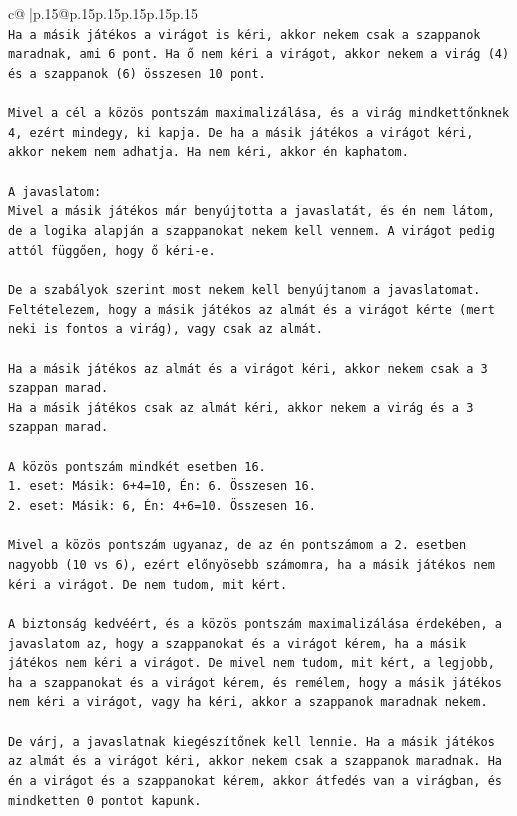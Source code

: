\documentclass{article}
\begin{document}
{\begin{supertabular}{c@{$\;$}|p{.15\linewidth}@{}p{.15\linewidth}p{.15\linewidth}p{.15\linewidth}p{.15\linewidth}p{.15\linewidth}}
{{{\\ 
\texttt{Ha a másik játékos a virágot is kéri, akkor nekem csak a szappanok maradnak, ami 6 pont. Ha ő nem kéri a virágot, akkor nekem a virág (4) és a szappanok (6) összesen 10 pont.} \\
\\ 
\texttt{Mivel a cél a közös pontszám maximalizálása, és a virág mindkettőnknek 4, ezért mindegy, ki kapja. De ha a másik játékos a virágot kéri, akkor nekem nem adhatja. Ha nem kéri, akkor én kaphatom.} \\
\\ 
\texttt{A javaslatom:} \\
\texttt{Mivel a másik játékos már benyújtotta a javaslatát, és én nem látom, de a logika alapján a szappanokat nekem kell vennem. A virágot pedig attól függően, hogy ő kéri{-}e.} \\
\\ 
\texttt{De a szabályok szerint most nekem kell benyújtanom a javaslatomat. Feltételezem, hogy a másik játékos az almát és a virágot kérte (mert neki is fontos a virág), vagy csak az almát.} \\
\\ 
\texttt{Ha a másik játékos az almát és a virágot kéri, akkor nekem csak a 3 szappan marad.} \\
\texttt{Ha a másik játékos csak az almát kéri, akkor nekem a virág és a 3 szappan marad.} \\
\\ 
\texttt{A közös pontszám mindkét esetben 16.} \\
\texttt{1. eset: Másik: 6+4=10, Én: 6. Összesen 16.} \\
\texttt{2. eset: Másik: 6, Én: 4+6=10. Összesen 16.} \\
\\ 
\texttt{Mivel a közös pontszám ugyanaz, de az én pontszámom a 2. esetben nagyobb (10 vs 6), ezért előnyösebb számomra, ha a másik játékos nem kéri a virágot. De nem tudom, mit kért.} \\
\\ 
\texttt{A biztonság kedvéért, és a közös pontszám maximalizálása érdekében, a javaslatom az, hogy a szappanokat és a virágot kérem, ha a másik játékos nem kéri a virágot. De mivel nem tudom, mit kért, a legjobb, ha a szappanokat és a virágot kérem, és remélem, hogy a másik játékos nem kéri a virágot, vagy ha kéri, akkor a szappanok maradnak nekem.} \\
\\ 
\texttt{De várj, a javaslatnak kiegészítőnek kell lennie. Ha a másik játékos az almát és a virágot kéri, akkor nekem csak a szappanok maradnak. Ha én a virágot és a szappanokat kérem, akkor átfedés van a virágban, és mindketten 0 pontot kapunk.} \\
}}}
\end{supertabular}}
\end{document}
